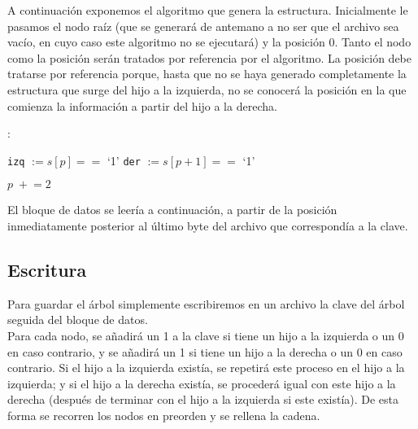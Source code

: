 \documentclass{article}
\newenvironment{algo}{
\vspace*{0.5cm}
\begin{algorithm}[H]}{
\end{algorithm}
\vspace*{0.5cm}
}
\begin{document}
A continuación exponemos el algoritmo que genera la estructura. Inicialmente le
pasamos el nodo raíz (que se generará de antemano a no ser que el archivo sea
vacío, en cuyo caso este algoritmo no se ejecutará) y la posición 0. Tanto el nodo
como la posición serán tratados por referencia por el algoritmo. La posición debe
tratarse por referencia porque, hasta que no se haya generado completamente la
estructura que surge del hijo a la izquierda, no se conocerá la posición en la que
comienza la información a partir del hijo a la derecha.

\begin{algo}
: \\

\BlankLine

\texttt{izq} $ := s[p] == $ `1'\;
\texttt{der} $ := s[p+1] == $ `1'\;
\BlankLine


\BlankLine

$p \;+\!\!= 2$\;

\BlankLine


\end{algo}

El bloque de datos se leería a continuación, a partir de la posición inmediatamente
posterior al último byte del archivo que correspondía a la clave.

\subsection{Escritura}

Para guardar el árbol simplemente escribiremos en un archivo la clave del árbol
seguida del bloque de datos. \\

Para cada nodo, se añadirá un 1 a la clave si tiene un hijo a la izquierda o un 0
en caso contrario, y se añadirá un 1 si tiene un hijo a la derecha o un 0 en caso
contrario. Si el hijo a la izquierda existía, se repetirá este proceso en el hijo
a la izquierda; y si el hijo a la derecha existía, se procederá igual con este hijo
a la derecha (después de terminar con el hijo a la izquierda si este existía). De
esta forma se recorren los nodos en preorden y se rellena la cadena. \\
\end{document}
